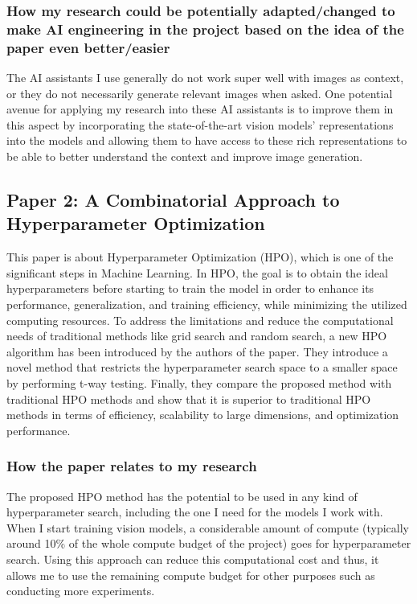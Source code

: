 \documentclass[11pt]{article}
\begin{document}
\subsubsection{How my research could be potentially adapted/changed to make AI engineering in the project based on the idea of the paper even better/easier}
The AI assistants I use generally do not work super well with images as context, or they do not necessarily generate relevant images when asked. One potential avenue for applying my research into these AI assistants is to improve them in this aspect by incorporating the state-of-the-art vision models' representations into the models and allowing them to have access to these rich representations to be able to better understand the context and improve image generation.

\subsection{Paper 2: A Combinatorial Approach to Hyperparameter Optimization}
This paper is about Hyperparameter Optimization (HPO), which is one of the significant steps in Machine Learning. In HPO, the goal is to obtain the ideal hyperparameters before starting to train the model in order to enhance its performance, generalization, and training efficiency, while minimizing the utilized computing resources. To address the limitations and reduce the computational needs of traditional methods like grid search and random search, a new HPO algorithm has been introduced by the authors of the paper. They introduce a novel method that restricts the hyperparameter search space to a smaller space by performing t-way testing. Finally, they compare the proposed method with traditional HPO methods and show that it is superior to traditional HPO methods in terms of efficiency, scalability to large dimensions, and optimization performance.

\subsubsection{How the paper relates to my research}
The proposed HPO method has the potential to be used in any kind of hyperparameter search, including the one I need for the models I work with. When I start training vision models, a considerable amount of compute (typically around 10\% of the whole compute budget of the project) goes for hyperparameter search. Using this approach can reduce this computational cost and thus, it allows me to use the remaining compute budget for other purposes such as conducting more experiments.
\end{document}
